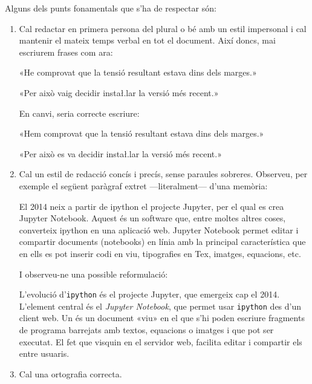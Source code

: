 \documentclass{tfgitic}
\begin{document}
Alguns dels punts fonamentals que s'ha de respectar són:
\begin{enumerate}
\item Cal redactar en primera persona del plural o bé amb un estil
  impersonal i cal mantenir el mateix temps verbal en tot
  el document. Així doncs, mai escriurem frases com ara:
  \begin{displayquote}
    «He comprovat que la tensió resultant estava dins dels marges.»
  \end{displayquote}
  \begin{displayquote}
    «Per això vaig decidir insta\l.lar la versió més recent.»
  \end{displayquote}
  En canvi, seria correcte escriure:
  \begin{displayquote}
    «Hem comprovat que la tensió resultant estava dins dels marges.»
  \end{displayquote}
  \begin{displayquote}
    «Per això es va decidir insta\l.lar la versió més recent.»
  \end{displayquote}
\item Cal un estil de redacció concís i precís, sense paraules
  sobreres. Observeu, per exemple el següent paràgraf extret
  ---literalment--- d'una memòria:
  \begin{displayquote}
    El 2014 neix a partir de ipython el projecte Jupyter, per el qual
    es crea Jupyter Notebook.  Aquest és un software que, entre moltes
    altres coses, converteix ipython en una aplicació web.  Jupyter
    Notebook permet editar i compartir documents (notebooks) en línia
    amb la principal característica que en ells es pot inserir codi en
    viu, tipografies en Tex, imatges, equacions, etc.
  \end{displayquote}
  I observeu-ne una possible reformulació:
  \begin{displayquote}
    L'evolució d'\texttt{ipython} és el projecte Jupyter, que emergeix
    cap el 2014. L'element central és el \emph{Jupyter Notebook}, que
    permet usar \texttt{ipython} des d'un client web. Un 
    és un document «viu» en el que s'hi poden escriure fragments de
    programa barrejats amb textos, equacions o imatges i que pot ser
    executat. El fet que visquin en el servidor web, facilita editar i
    compartir els  entre usuaris.
  \end{displayquote}
\item Cal una ortografia correcta.
\end{enumerate}
\end{document}
